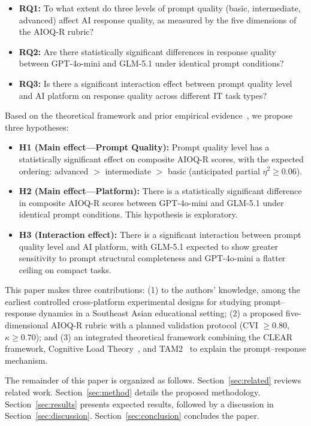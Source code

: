 \documentclass[runningheads]{llncs}
\begin{document}
\begin{itemize}
  \item \textbf{RQ1:} To what extent do three levels of prompt quality (basic, intermediate, advanced) affect AI response quality, as measured by the five dimensions of the AIOQ-R rubric?
  \item \textbf{RQ2:} Are there statistically significant differences in response quality between GPT-4o-mini and GLM-5.1 under identical prompt conditions?
  \item \textbf{RQ3:} Is there a significant interaction effect between prompt quality level and AI platform on response quality across different IT task types?
\end{itemize}

Based on the theoretical framework and prior empirical evidence~\cite{Knoth2024,Sawalha2024,Kumar2025}, we propose three hypotheses:

\begin{itemize}
  \item \textbf{H1 (Main effect---Prompt Quality):} Prompt quality level has a statistically significant effect on composite AIOQ-R scores, with the expected ordering: advanced $>$ intermediate $>$ basic (anticipated partial $\eta^2 \geq 0.06$).
  \item \textbf{H2 (Main effect---Platform):} There is a statistically significant difference in composite AIOQ-R scores between GPT-4o-mini and GLM-5.1 under identical prompt conditions. This hypothesis is exploratory.
  \item \textbf{H3 (Interaction effect):} There is a significant interaction between prompt quality level and AI platform, with GLM-5.1 expected to show greater sensitivity to prompt structural completeness and GPT-4o-mini a flatter ceiling on compact tasks.
\end{itemize}

This paper makes three contributions: (1) to the authors' knowledge, among the earliest controlled cross-platform experimental designs for studying prompt--response dynamics in a Southeast Asian educational setting; (2) a proposed five-dimensional AIOQ-R rubric with a planned validation protocol (CVI $\geq 0.80$, $\kappa \geq 0.70$); and (3) an integrated theoretical framework combining the CLEAR framework, Cognitive Load Theory~\cite{Sweller1988}, and TAM2~\cite{Davis1989,Venkatesh2000} to explain the prompt--response mechanism.

The remainder of this paper is organized as follows. Section~\ref{sec:related} reviews related work. Section~\ref{sec:method} details the proposed methodology. Section~\ref{sec:results} presents expected results, followed by a discussion in Section~\ref{sec:discussion}. Section~\ref{sec:conclusion} concludes the paper.
\end{document}
